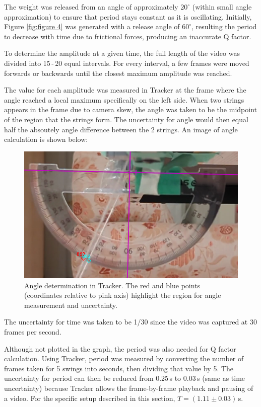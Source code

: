 \documentclass[11pt]{article}
\begin{document}
\begin{multicols}{2}
The weight was released from an angle of approximately $20^\circ$ (within small angle approximation) to ensure that period stays constant as it is oscillating.  Initially, Figure \ref{fig:figure 4} was generated with a release angle of $60^\circ$, resulting the period to decrease with time due to frictional forces, producing an inaccurate Q factor.

To determine the amplitude at a given time, the full length of the video was divided into 15\,-\,20 equal intervals. For every interval, a few frames were moved forwards or backwards until the closest maximum amplitude was reached.

The value for each amplitude was measured in Tracker \cite{tracker} at the frame where the angle reached a local maximum specifically on the left side. When two strings appears in the frame due to camera skew, the angle was taken to be the midpoint of the region that the strings form. The uncertainty for angle would then equal half the absoutely angle difference between the 2 strings. An image of angle calculation is shown below:

\begin{figure}[H]
    \centering
    \includegraphics[width=\linewidth]{../figures/tracker.png}
    \caption{\centering Angle determination in Tracker. The red and blue points (coordinates relative to pink axis) highlight the region for angle measurement and uncertainty.}
    \label{fig:figure5}
\end{figure}

The uncertainty for time was taken to be 1/30 since the video was captured at 30 frames per second.

Although not plotted in the graph, the period was also needed for Q factor calculation. Using Tracker, period was measured by converting the number of frames taken for 5 swings into seconds, then dividing that value by 5. The uncertainty for period can then be reduced from 0.25\,s to 0.03\,s (same as time uncertainty) because Tracker allows the frame-by-frame playback and pausing of a video. For the specific setup described in this section, $T = (1.11 \pm 0.03)$\,s.


\end{multicols}
\end{document}
